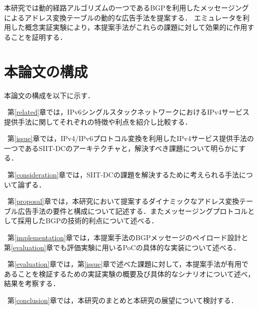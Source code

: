 本研究では動的経路アルゴリズムの一つであるBGP\cite{RFC4271}を利用したメッセージングによるアドレス変換テーブルの動的な広告手法を提案する．
エミュレータを利用した概念実証実験により，本提案手法がこれらの課題に対して効果的に作用することを証明する．



\section{本論文の構成}

本論文の構成を以下に示す．

~第\ref{related}章では，IPv6シングルスタックネットワークにおけるIPv4サービス提供手法に関してそれぞれの特徴や利点を紹介し比較する．

~第\ref{issue}章では，IPv4/IPv6プロトコル変換を利用したIPv4サービス提供手法の一つであるSIIT-DCのアーキテクチャと，解決すべき課題について明らかにする．

~第\ref{consideration}章では，SIIT-DCの課題を解決するために考えられる手法について論ずる．

~第\ref{proposal}章では，本研究において提案するダイナミックなアドレス変換テーブル広告手法の要件と構成について記述する．またメッセージングプロトコルとして採用したBGPの技術的利点について述べる．

~第\ref{implementation}章では，本提案手法のBGPメッセージのペイロード設計と第\ref{evaluation}章でも評価実験に用いるPoCの具体的な実装について述べる．

~第\ref{evaluation}章では，第\ref{issue}章で述べた課題に対して，本提案手法が有用であることを検証するための実証実験の概要及び具体的なシナリオについて述べ，結果を考察する．

~第\ref{conclusion}章では，本研究のまとめと本研究の展望について検討する．

